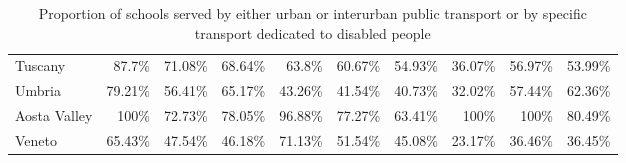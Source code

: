 \documentclass[openany, 11pt, oneside]{book}
\begin{document}
\begin{subappendices}
\begin{table}[ht]
{\begin{tabular}{l|rrrrrrrrr}
  Tuscany & 87.7\% & 71.08\% & 68.64\% & 63.8\% & 60.67\% & 54.93\% & 36.07\% & 56.97\% & 53.99\% \\ 
  Umbria & 79.21\% & 56.41\% & 65.17\% & 43.26\% & 41.54\% & 40.73\% & 32.02\% & 57.44\% & 62.36\% \\ 
  Aosta Valley & 100\% & 72.73\% & 78.05\% & 96.88\% & 77.27\% & 63.41\% & 100\% & 100\% & 80.49\% \\ 
  Veneto & 65.43\% & 47.54\% & 46.18\% & 71.13\% & 51.54\% & 45.08\% & 23.17\% & 36.46\% & 36.45\% \\ 
   \hline
\end{tabular}
}
  \captionsetup{width=0.9\textwidth}
\caption{Proportion of schools served by either urban or interurban public transport or by specific transport dedicated to disabled people}
\label{tab:transport}
\end{table}




\end{subappendices}
\end{document}
